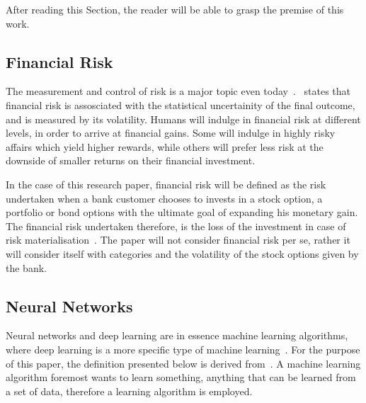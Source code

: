 \documentclass{article}
\begin{document}
After reading this Section, the reader will be able to grasp the premise of this work.

\subsection{Financial Risk}
\label{sub:financial_risk}

The measurement and control of risk is a major topic even today~\cite{finRisk}.~\cite{finRisk} states that financial risk is assosciated with the statistical uncertainity of the final outcome, and is measured by its volatility. Humans will indulge in financial risk at different levels, in order to arrive at financial gains. Some will indulge in highly risky affairs which yield higher rewards, while others will prefer less risk at the downside of smaller returns on their financial investment.

In the case of this research paper, financial risk will be defined as the risk undertaken when a bank customer chooses to invests in a stock option, a portfolio or bond options with the ultimate goal of expanding his monetary gain. The financial risk undertaken therefore, is the loss of the investment in case of risk materialisation~\cite{finRisk}. The paper will not consider financial risk per se, rather it will consider itself with categories and the volatility of the stock options given by the bank.

\subsection{Neural Networks}
\label{sub:neural_networks}

Neural networks and deep learning are in essence machine learning algorithms, where deep learning is a more specific type of machine learning~\cite{neuralBook}. For the purpose of this paper, the definition presented below is derived from~\cite{neuralBook}. A machine learning algorithm foremost wants to learn something, anything that can be learned from a set of data, therefore a learning algorithm is employed.
\end{document}
